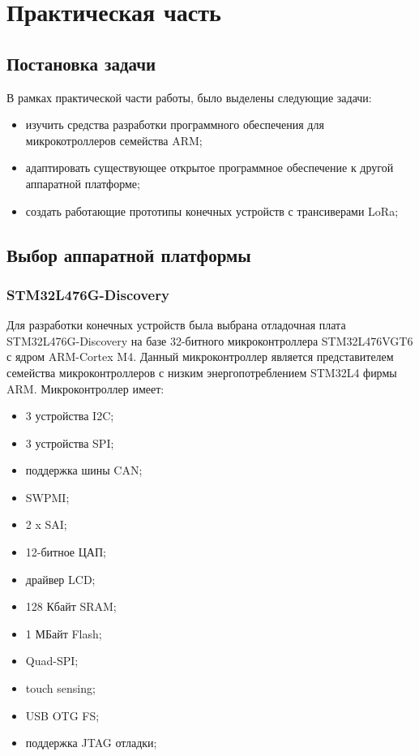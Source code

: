\chapter{Практическая часть}
\label{cha:pract}

\section{Постановка задачи}

В рамках практической части работы, было выделены следующие задачи:

\begin{itemize}
 \item изучить средства разработки программного обеспечения для микрокотроллеров семейства ARM;
 \item адаптировать существующее открытое программное обеспечение к другой аппаратной платформе;
 \item создать работающие прототипы конечных устройств с трансиверами LoRa;
\end{itemize}

\section{Выбор аппаратной платформы}

\subsection{STM32L476G-Discovery}

Для разработки конечных устройств была выбрана отладочная плата STM32L476G-Discovery на базе 32-битного микроконтроллера STM32L476VGT6 с ядром ARM-Cortex M4.
Данный микроконтроллер является представителем семейства микроконтроллеров с низким энергопотреблением STM32L4 фирмы ARM.
Микроконтроллер имеет:
\begin{itemize}
 \item 3 устройства I2C;
 \item 3 устройства SPI;
 \item поддержка шины CAN;
 \item SWPMI;
 \item 2 x SAI;
 \item 12-битное ЦАП;
 \item драйвер LCD;
 \item 128 Кбайт SRAM;
 \item 1 МБайт Flash;
 \item Quad-SPI;
 \item touch sensing;
 \item USB OTG FS;
 \item поддержка JTAG отладки;
\end{itemize}

